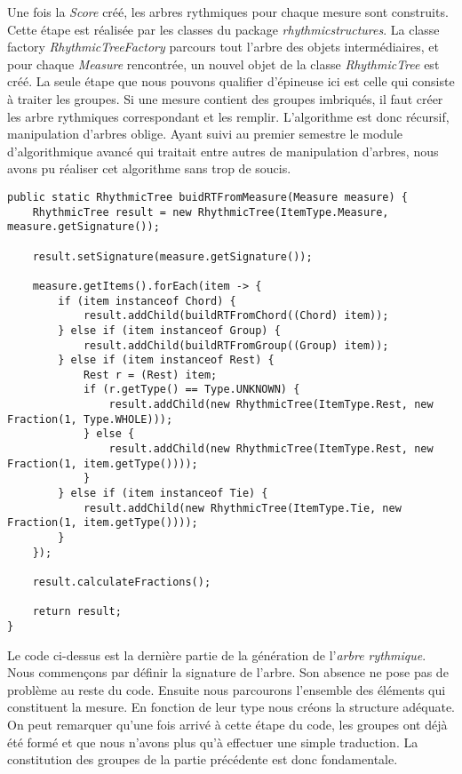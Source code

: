 \par
Une fois la \emph{Score} créé, les arbres rythmiques pour chaque mesure sont construits. Cette étape est réalisée par les classes du package \emph{rhythmicstructures}. La classe factory \emph{RhythmicTreeFactory} parcours tout l'arbre des objets intermédiaires, et pour chaque \emph{Measure} rencontrée, un nouvel objet de la classe \emph{RhythmicTree} est créé. La seule étape que nous pouvons qualifier d'épineuse ici est celle qui consiste à traiter les groupes. Si une mesure contient des groupes imbriqués, il faut créer les arbre rythmiques correspondant et les remplir. L'algorithme est donc récursif, manipulation d'arbres oblige. Ayant suivi au premier semestre le module d'algorithmique avancé qui traitait entre autres de manipulation d'arbres, nous avons pu réaliser cet algorithme sans trop de soucis.

\begin{lstlisting}[caption=Code de la méthode buidRTFromMeasure]
public static RhythmicTree buidRTFromMeasure(Measure measure) {
	RhythmicTree result = new RhythmicTree(ItemType.Measure, measure.getSignature());

	result.setSignature(measure.getSignature());

	measure.getItems().forEach(item -> {
		if (item instanceof Chord) {
			result.addChild(buildRTFromChord((Chord) item));
		} else if (item instanceof Group) {
			result.addChild(buildRTFromGroup((Group) item));
		} else if (item instanceof Rest) {
			Rest r = (Rest) item;
			if (r.getType() == Type.UNKNOWN) {
				result.addChild(new RhythmicTree(ItemType.Rest, new Fraction(1, Type.WHOLE)));
			} else {
				result.addChild(new RhythmicTree(ItemType.Rest, new Fraction(1, item.getType())));
			}
		} else if (item instanceof Tie) {
			result.addChild(new RhythmicTree(ItemType.Tie, new Fraction(1, item.getType())));
		}
	});

	result.calculateFractions();

	return result;
}
\end{lstlisting}

\par
Le code ci-dessus est la dernière partie de la génération de l'\emph{arbre rythmique}. Nous commençons par définir la signature de l'arbre. Son absence ne pose pas de problème au reste du code. Ensuite nous parcourons l'ensemble des éléments qui constituent la mesure. En fonction de leur type nous créons la structure adéquate. On peut remarquer qu'une fois arrivé à cette étape du code, les groupes ont déjà été formé et que nous n'avons plus qu'à effectuer une simple traduction. La constitution des groupes de la partie précédente est donc fondamentale.

